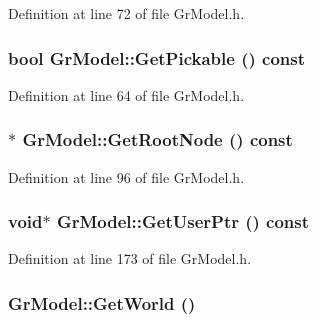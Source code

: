 Definition at line 72 of file GrModel.h.\hypertarget{class_gr_model_fa97c9215a2c2dcee2df132561f03698}{
\subsubsection[{GetPickable}]{\setlength{\rightskip}{0pt plus 5cm}bool GrModel::GetPickable () const}}
\label{class_gr_model_fa97c9215a2c2dcee2df132561f03698}




Definition at line 64 of file GrModel.h.\hypertarget{class_gr_model_c5dbd78174e81a8cd4c64782d9b21bc9}{
\subsubsection[{GetRootNode}]{$\ast$ GrModel::GetRootNode () const}}
\label{class_gr_model_c5dbd78174e81a8cd4c64782d9b21bc9}




Definition at line 96 of file GrModel.h.\hypertarget{class_gr_model_32d18da9318a7541316adaa52e8e2b99}{
\subsubsection[{GetUserPtr}]{\setlength{\rightskip}{0pt plus 5cm}void$\ast$ GrModel::GetUserPtr () const}}
\label{class_gr_model_32d18da9318a7541316adaa52e8e2b99}




Definition at line 173 of file GrModel.h.\hypertarget{class_gr_model_624ce6372c1bdd5a077e51c16adb9242}{
\subsubsection[{GetWorld}]{ GrModel::GetWorld ()}}
\label{class_gr_model_624ce6372c1bdd5a077e51c16adb9242}




